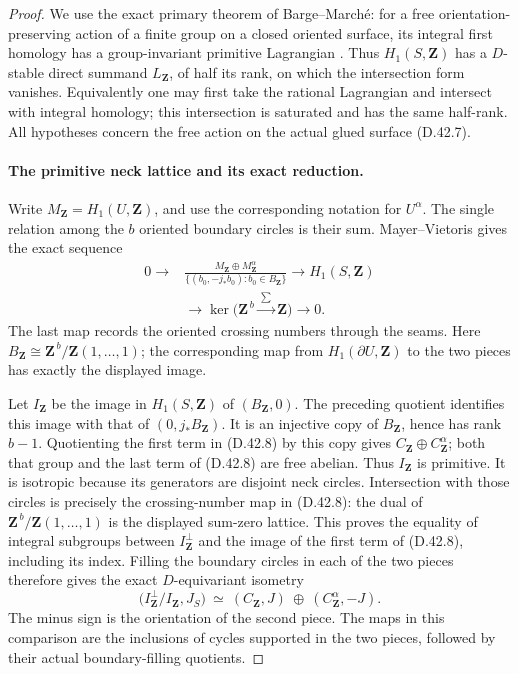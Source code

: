 \begin{proof}
We use the exact primary theorem of Barge--March\'e:
for a free orientation-preserving action of a finite
group on a closed oriented surface, its integral first
homology has a group-invariant primitive Lagrangian
\cite[Theorem~1, integral formulation in the author
version]{ABargeMarche2024}.
Thus \(H_1(S,\mathbf Z)\) has a \(D\)-stable direct
summand \(L_{\mathbf Z}\), of half its rank, on which
the intersection form vanishes.
Equivalently one may first take the rational
Lagrangian and intersect with integral homology;
this intersection is saturated and has the same
half-rank.
All hypotheses concern the free action on the actual
glued surface \textup{(D.42.7)}.

\paragraph{The primitive neck lattice and its exact reduction.}
Write \(M_{\mathbf Z}=H_1(U,\mathbf Z)\),
and use the corresponding notation for \(U^\alpha\).
The single relation among the \(b\) oriented boundary
circles is their sum.
Mayer--Vietoris gives the exact sequence
\[
 \begin{split}
 0\longrightarrow&
 \frac{M_{\mathbf Z}\oplus M_{\mathbf Z}^{\alpha}}
 {\{(b_0,-j_*b_0):b_0\in B_{\mathbf Z}\}}
 \longrightarrow H_1(S,\mathbf Z)\\
 &\longrightarrow
 \ker\bigl(\mathbf Z^{\,b}\xrightarrow{\ \sum\ }\mathbf Z\bigr)
 \longrightarrow0 .
 \end{split}
 \tag{D.42.8}
\]
The last map records the oriented crossing numbers
through the seams.
Here \(B_{\mathbf Z}\cong
\mathbf Z^{\,b}/\mathbf Z(1,\ldots,1)\);
the corresponding map from \(H_1(\partial U,\mathbf Z)\)
to the two pieces has exactly the displayed image.

Let \(I_{\mathbf Z}\) be the image in \(H_1(S,\mathbf Z)\)
of \((B_{\mathbf Z},0)\).
The preceding quotient identifies this image with
that of \((0,j_*B_{\mathbf Z})\).
It is an injective copy of \(B_{\mathbf Z}\), hence
has rank \(b-1\).
Quotienting the first term in
\textup{(D.42.8)} by this copy gives
\(C_{\mathbf Z}\oplus C_{\mathbf Z}^{\alpha}\);
both that group and the last term of
\textup{(D.42.8)} are free abelian.
Thus \(I_{\mathbf Z}\) is primitive.
It is isotropic because its generators are disjoint
neck circles.
Intersection with those circles is precisely the
crossing-number map in \textup{(D.42.8)}:
the dual of
\(\mathbf Z^{\,b}/\mathbf Z(1,\ldots,1)\)
is the displayed sum-zero lattice.
This proves the equality of integral subgroups
between \(I_{\mathbf Z}^{\perp}\) and the image of the
first term of \textup{(D.42.8)}, including its index.
Filling the boundary circles in each of the two pieces
therefore gives the exact \(D\)-equivariant isometry
\[
 \bigl(I_{\mathbf Z}^{\perp}/I_{\mathbf Z},
                   J_S\bigr)
       \ \simeq\
       (C_{\mathbf Z},J)\ \oplus\
       (C_{\mathbf Z}^{\alpha},-J).
 \tag{D.42.9}
\]
The minus sign is the orientation of the second piece.
The maps in this comparison are the inclusions of
cycles supported in the two pieces, followed by
their actual boundary-filling quotients.


\end{proof}
